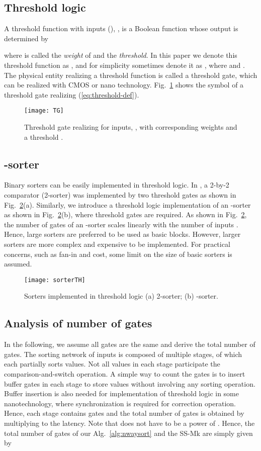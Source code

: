 \documentclass[10pt,journal,cspaper,compsoc]{IEEEtran}
\begin{document}
\subsection{Threshold logic}
A threshold function \cite{Mur71}  with  inputs (), , is a Boolean function whose output is determined by

where  is called the {\em weight} of  and  the {\em threshold}. In this paper we denote this threshold function as , and for simplicity sometimes denote it as , where   and . The physical entity realizing a threshold function is called a threshold gate, which can be realized with CMOS or nano technology. Fig.~\ref{fig:TG} shows the symbol of a threshold gate realizing (\ref{eq:threshold-def}).

\begin{figure}[!h]
\centering
\texttt{[image: TG]}
\caption{Threshold gate realizing  for  inputs, , with corresponding weights  and a threshold .}
\label{fig:TG}
\end{figure}

\subsection{-sorter}
Binary sorters can be easily implemented in threshold logic. In \cite{Beiu1993enhanced}, a 2-by-2 comparator (2-sorter) was implemented by two threshold gates as shown in Fig.~\ref{fig:sorterTH}(a). Similarly, we introduce a threshold logic implementation of an -sorter as shown in Fig.~\ref{fig:sorterTH}(b), where  threshold gates are required. As shown in Fig.~\ref{fig:sorterTH}, the number of gates of an -sorter scales linearly with the number of inputs .
Hence, large sorters are preferred to be used as basic blocks. However, larger sorters are more complex and expensive to be implemented.
For practical concerns, such as fan-in and cost, some limit on the size of basic sorters is assumed.

\begin{figure}[!h]
\centering
\texttt{[image: sorterTH]}
\caption{Sorters implemented in threshold logic (a) 2-sorter; (b) -sorter.}
\label{fig:sorterTH}
\end{figure}

\subsection{Analysis of number of gates}
In the following, we assume all gates are the same and derive the total number of gates. The sorting network of  inputs is composed of multiple stages, of which each partially sorts  values. Not all values in each stage participate the comparison-and-switch operation.
A simple way to count the gates is to insert buffer gates in each stage to store values without involving any sorting operation. Buffer insertion is also needed for implementation of threshold logic in some nanotechnology, where synchronization is required for correction operation.
Hence, each stage contains  gates and the total number of gates is obtained by multiplying  to the latency.
Note that  does not have to be a power of .
Hence, the total number of gates of our Alg.~\ref{alg:nwaysort} and the SS-Mk \cite{gao1997sloping} are simply given by
\end{document}

